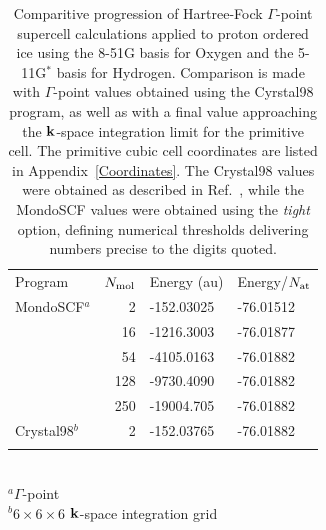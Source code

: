 \documentclass[prb,aps,nobibnotes,twocolumn,doublespace,twocolumngrid,superbib]{revtex4}
\begin{document}
%
%
%
\suppressfloats
\begin{table}
\caption{
Comparitive progression of Hartree-Fock $\Gamma$-point supercell calculations 
applied to proton ordered ice using the 8-51G basis for Oxygen and the 5-11G$^*$ 
basis for Hydrogen.
Comparison is made with $\Gamma$-point values obtained using the {\sc Cyrstal98} program, 
as well as with a final value approaching the $\bf k$-space integration limit for the 
primitive cell.  The primitive cubic cell coordinates are listed in Appendix~\ref{Coordinates}.
The {\sc Crystal98} values were obtained as described in Ref.~\cite{PIceProceedure}, while 
the {\sc MondoSCF} values were obtained using the {\it tight} option, defining numerical 
thresholds delivering numbers precise to the digits quoted.} 
\label{PIceTable}
\begin{tabular}{lrll}
\toprule
Program         & $N_{\rm mol}$              & Energy (au)    & Energy/$N_{\rm at}$\\ 
\colrule
{\sc MondoSCF}$^a$  & 2    &  -152.03025  &  -76.01512  \\
                    & 16   &  -1216.3003  &  -76.01877  \\
                    & 54   &  -4105.0163  &  -76.01882  \\
                    & 128  &  -9730.4090  &  -76.01882  \\
                    & 250  &  -19004.705  &  -76.01882  \\ 
\hline
{\sc Crystal98}$^b$  & 2   &  -152.03765  &  -76.01882  \\ 
\botrule
\end{tabular}\\
$^a \Gamma$-point\\
$^b 6\times6\times6$ $\bf k$-space integration grid \\
\end{table}
%
%
%
\suppressfloats
\end{document}
